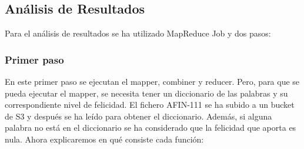 \documentclass[12pt,a4paper]{article}
\begin{document}
\subsection{Análisis de Resultados}

Para el análisis de resultados se ha utilizado MapReduce Job  y dos pasos:

\subsubsection{Primer paso}
En este primer paso se ejecutan el mapper, combiner y reducer. Pero, para que se pueda ejecutar el mapper, se necesita tener un diccionario de las palabras y su correspondiente nivel de felicidad. El fichero AFIN-111 se ha subido a un bucket de S3 y después se ha leído para obtener el diccionario. Además, si alguna palabra no está en el diccionario se ha considerado que la felicidad que aporta es nula. Ahora explicaremos en qué consiste cada función:
\end{document}
